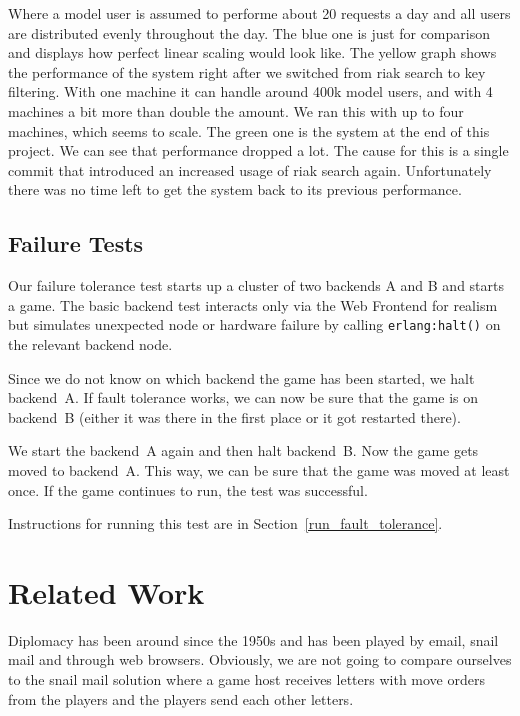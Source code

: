 \documentclass[11pt,a4paper]{report}
\newcommand{\hi}[1]{{\color{red}\em #1\/}\\}
\begin{document}
Where a model user is assumed to performe about 20 requests a day and
all users are distributed evenly throughout the day.
The blue one is just for comparison and displays how perfect linear scaling would look like.
The yellow graph shows the performance of the system right after we switched from
riak search to key filtering.
With one machine it can handle around 400k model users, and with 4 machines
a bit more than double the amount.
We ran this with up to four machines, which seems to scale.
The green one is the system at the end of this project.
We can see that performance dropped a lot.
The cause for this is a single commit that introduced an increased usage of riak search again.
Unfortunately there was no time left to get the system back to its previous performance.


\section{Failure Tests}
Our failure tolerance test starts up a cluster of two backends A and B and
starts a game. The basic backend test interacts only via the Web Frontend
for realism but simulates unexpected node or hardware failure by calling
{\tt erlang:halt()} on the relevant backend node.

Since we do not know on which backend the game has been started, we halt
backend~A. If fault tolerance works, we can now be sure that the game is on
backend~B (either it was there in the first place or it got restarted there).

We start the backend~A again and then halt backend~B. Now the game gets moved to
backend~A. This way, we can be sure that the game was moved at least once.
If the game continues to run, the test was successful.

Instructions for running this test are in Section~\ref{run_fault_tolerance}.

\chapter{Related Work}


Diplomacy has been around since the 1950s and has been played by email, snail
mail and through web browsers. Obviously, we are not going to compare ourselves
to the snail mail solution where a game host receives letters with move orders
from the players and the players send each other letters.
\end{document}
